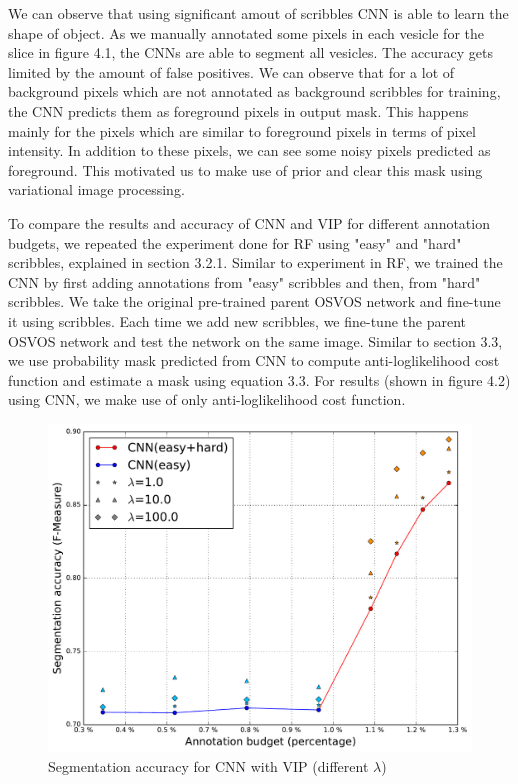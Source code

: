 We can observe that using significant amout of scribbles CNN is able to learn the shape of object. As we manually annotated some pixels in each vesicle for the slice in figure 4.1, the CNNs are able to segment all vesicles. The accuracy gets limited by the amount of false positives. We can observe that for a lot of background pixels which are not annotated as background scribbles for training, the CNN predicts them as foreground pixels in output mask. This happens mainly for the pixels which are similar to foreground pixels in terms of pixel intensity. In addition to these pixels, we can see some noisy pixels predicted as foreground. This motivated us to make use of prior and clear this mask using variational image processing. \par
To compare the results and accuracy of CNN and VIP for different annotation budgets, we repeated the experiment done for RF using "easy" and "hard" scribbles, explained in section 3.2.1. Similar to experiment in RF, we trained the CNN by first adding annotations from "easy" scribbles and then, from "hard" scribbles. We take the original pre-trained parent OSVOS network and fine-tune it using scribbles. Each time we add new scribbles, we fine-tune the parent OSVOS network and test the network on the same image. Similar to section 3.3, we use probability mask predicted from CNN to compute anti-loglikelihood cost function and estimate a mask using equation 3.3. For results (shown in figure 4.2) using CNN, we make use of only anti-loglikelihood cost function.

\begin{figure}[h!] \label{fig:cnnvip}
\centering
 \includegraphics[width=0.8\linewidth]{figures/cnn_vip.pdf}
 \caption{Segmentation accuracy for CNN with VIP (different $\lambda$)}
\end{figure}

